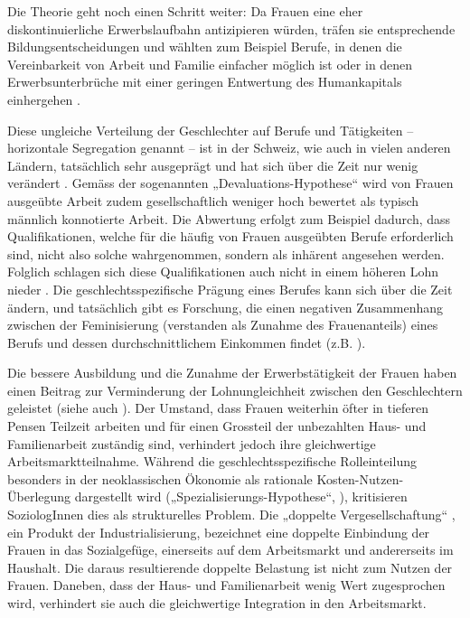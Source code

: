 \documentclass[a4paper,12pt]{article}
\renewcommand{\baselinestretch}{1.1}
\newif\ifcomments
\newcommand{\comment}[1]{%
    \ifcomments\marginpar{\renewcommand{\baselinestretch}{1}\tiny\hspace*{-1.1em}\colorbox{gray!20}%
    {\textcolor{red}{\parbox[t]{.9in}{\raggedright #1}}}}\fi}
\begin{document}
Die Theorie geht noch einen Schritt weiter: Da Frauen eine eher
diskontinuierliche Erwerbslaufbahn antizipieren würden, träfen sie entsprechende
Bildungsentscheidungen und wählten zum Beispiel Berufe, in denen die
Vereinbarkeit von Arbeit und Familie einfacher möglich ist oder in denen
Erwerbsunterbrüche mit einer geringen Entwertung des Humankapitals einhergehen
\citep{Polachek-1981}.

\comment{diesen Abschnitt in den Theorieteil?}
Diese ungleiche Verteilung der Geschlechter auf Berufe und Tätigkeiten -- horizontale Segregation genannt -- ist in der Schweiz, wie auch in vielen anderen Ländern, tatsächlich sehr ausgeprägt und hat sich über die Zeit nur wenig verändert \citep{Buchmann-Kriesi-2012,Charles-2005,Schwiter-etal-2014}.
Gemäss der sogenannten „Devaluations-Hypothese“
\citep{England-etal-1988,Liebeskind-2004} wird von Frauen ausgeübte Arbeit zudem 
gesellschaftlich weniger hoch bewertet als typisch männlich konnotierte Arbeit. Die
Abwertung erfolgt zum Beispiel dadurch, dass Qualifikationen, welche für die
häufig von Frauen ausgeübten Berufe erforderlich sind, nicht also solche
wahrgenommen, sondern als inhärent angesehen werden. Folglich schlagen sich
diese Qualifikationen auch nicht in einem höheren Lohn nieder
\citep{England-1992,England-2005,Gottschall-1995}. Die geschlechtsspezifische
Prägung eines Berufes kann sich über die Zeit ändern, und tatsächlich gibt es
Forschung, die einen negativen Zusammenhang zwischen der Feminisierung
(verstanden als Zunahme des Frauenanteils) eines Berufs und dessen
durchschnittlichem Einkommen findet (z.B.
\citealp{Levanon-etal-2009,Murphy-Oesch-2016}).

Die bessere Ausbildung und die Zunahme der Erwerbstätigkeit der Frauen haben einen Beitrag
zur Verminderung der Lohnungleichheit zwischen den Geschlechtern geleistet
(siehe auch \citealp{Jann-Engelhardt-2008}). Der Umstand, dass Frauen weiterhin
öfter in tieferen Pensen Teilzeit arbeiten und für einen Grossteil der
unbezahlten Haus- und Familienarbeit zuständig sind, verhindert jedoch ihre
gleichwertige Arbeitsmarktteilnahme. Während die geschlechtsspezifische
Rolleinteilung besonders in der neoklassischen Ökonomie als rationale
Kosten-Nutzen-Überlegung dargestellt wird („Spezialisierungs-Hypothese“,
\citealp{Becker-1981}), kritisieren SoziologInnen dies als strukturelles
Problem. Die „doppelte Vergesellschaftung“ \citep{Becker-Schmidt-2008}, ein
Produkt der Industrialisierung, bezeichnet eine doppelte Einbindung der Frauen
in das Sozialgefüge, einerseits auf dem Arbeitsmarkt und andererseits im
Haushalt. Die daraus resultierende doppelte Belastung ist nicht zum Nutzen der
Frauen. Daneben, dass der Haus- und Familienarbeit wenig Wert zugesprochen
wird, verhindert sie auch die gleichwertige Integration in den Arbeitsmarkt.
\end{document}
